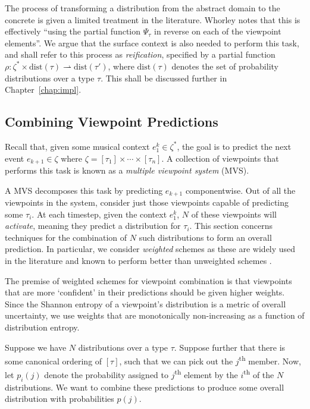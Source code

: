 \documentclass[12pt,a4paper,twoside,openright]{report}
\begin{document}
The process of transforming a distribution from the abstract domain to the
concrete is given a limited treatment in the literature. Whorley
\cite{whorley2013phd} notes that this is effectively ``using the partial
function $\Psi_\tau$ in reverse on each of the viewpoint elements''. We argue
that the surface context is also needed to perform this task, and shall refer to
this process as \emph{reification}, specified by a partial function $\rho :
\zeta^* \times \mathrm{dist}(\tau) \rightharpoonup \mathrm{dist}(\tau')$, where
$\mathrm{dist}(\tau)$ denotes the set of probability distributions over a type
$\tau$. This shall be discussed further in Chapter~\ref{chap:impl}.

\subsection{Combining Viewpoint Predictions}\label{sec:vp-comb}

Recall that, given some musical context $e_1^k \in \zeta^*$, the goal is to
predict the next event $e_{k+1} \in \zeta$ where $\zeta = [\tau_1] \times \cdots
\times [\tau_n]$.  A collection of viewpoints that performs this task is known
as a \emph{multiple viewpoint system} (MVS). 

A MVS decomposes this task by predicting $e_{k+1}$ componentwise. Out of all the
viewpoints in the system, consider just those viewpoints capable of predicting
some $\tau_i$. At each timestep, given the context $e_1^k$, $N$ of these
viewpoints will \emph{activate}, meaning they predict a distribution for
$\tau_i$. This section concerns techniques for the combination of $N$ such
distributions to form an overall prediction. In particular, we consider
\emph{weighted} schemes as these are widely used in the literature and known to
perform better than unweighted schemes \cite{pearce2004combining}.

The premise of weighted schemes for viewpoint combination is that viewpoints
that are more `confident' in their predictions should be given higher weights.
Since the Shannon entropy of a viewpoint's distribution is a metric of overall
uncertainty, we use weights that are monotonically non-increasing as a function
of distribution entropy.

Suppose we have $N$ distributions over a type $\tau$. Suppose further that there
is some canonical ordering of $[\tau]$, such that we can pick out the
$j$\textsuperscript{th} member. Now, let $p_i(j)$ denote the probability
assigned to $j$\textsuperscript{th} element by the $i$\textsuperscript{th} of the
$N$ distributions. We want to combine these predictions to produce some overall
distribution with
probabilities $p(j)$.
\end{document}
